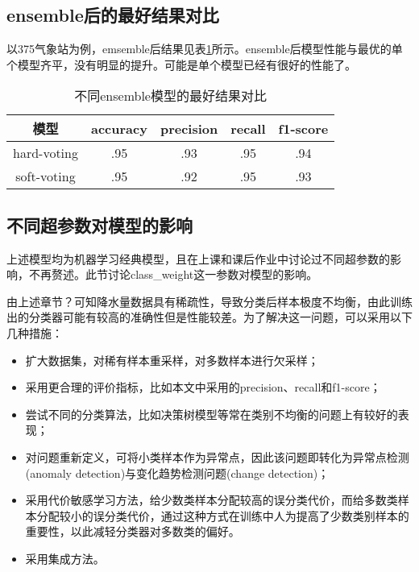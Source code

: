\documentclass[UTF8]{ctexart}
\begin{document}
\subsection{ensemble后的最好结果对比}
以375气象站为例，emsemble后结果见表\ref{tab:ensemble模型}所示。ensemble后模型性能与最优的单个模型齐平，没有明显的提升。可能是单个模型已经有很好的性能了。
\begin{table}[htb]
  \centering
  \begin{minipage}[t]{\linewidth}
    \centering
  \caption{不同ensemble模型的最好结果对比}
  \label{tab:ensemble模型}
    \begin{tabular}{ccccc}
      \toprule[1pt]
      模型 & accuracy & precision & recall & f1-score \\
      \midrule[0.5pt]
      hard-voting & .95& .93& .95& .94\\
      soft-voting &  .95& .92&.95 &.93 \\
      \bottomrule[1pt]
    \end{tabular}
  \end{minipage}
\end{table}


\subsection{不同超参数对模型的影响}
上述模型均为机器学习经典模型，且在上课和课后作业中讨论过不同超参数的影响，不再赘述。此节讨论class\_weight这一参数对模型的影响。

由上述章节？可知降水量数据具有稀疏性，导致分类后样本极度不均衡，由此训练出的分类器可能有较高的准确性但是性能较差。为了解决这一问题，可以采用以下几种措施：

\begin{itemize}
	\item 扩大数据集，对稀有样本重采样，对多数样本进行欠采样；
	\item 采用更合理的评价指标，比如本文中采用的precision、recall和f1-score；
	\item 尝试不同的分类算法，比如决策树模型等常在类别不均衡的问题上有较好的表现；
	\item 对问题重新定义，可将小类样本作为异常点，因此该问题即转化为异常点检测(anomaly detection)与变化趋势检测问题(change detection)；
	\item 采用代价敏感学习方法，给少数类样本分配较高的误分类代价，而给多数类样本分配较小的误分类代价，通过这种方式在训练中人为提高了少数类别样本的重要性，以此减轻分类器对多数类的偏好。
	\item 采用集成方法。

\end{itemize}
\end{document}
